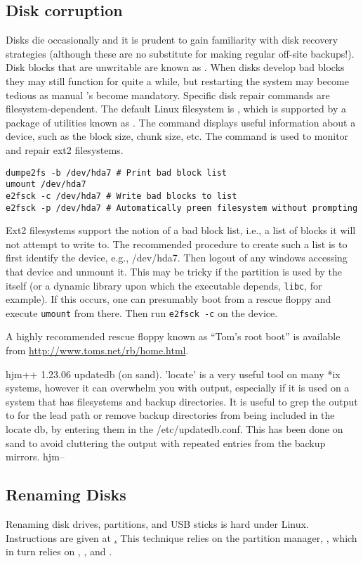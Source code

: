 \documentclass[12pt,twoside]{article}
\begin{document}
\subsection{Disk corruption}\label{sxn:fsck}
Disks die occasionally and it is prudent to gain familiarity with
disk recovery strategies (although these are no substitute for 
making regular off-site backups!).
Disk blocks that are unwritable are known as .
When disks develop bad blocks they may still function for quite a
while, but restarting the system may become tedious as manual
's become mandatory. 
Specific disk repair commands are filesystem-dependent.
The default Linux filesystem is , which is supported by a
package of utilities known as .
The  command displays useful information about a
device, such as the block size, chunk size, etc.
The  command is used to monitor and repair ext2
filesystems. 
\begin{verbatim}
dumpe2fs -b /dev/hda7 # Print bad block list
umount /dev/hda7
e2fsck -c /dev/hda7 # Write bad blocks to list
e2fsck -p /dev/hda7 # Automatically preen filesystem without prompting
\end{verbatim}
Ext2 filesystems support the notion of a bad block list, i.e., a list
of blocks it will not attempt to write to.
The recommended procedure to create such a list is to first identify
the device, e.g., /dev/hda7.
Then logout of any windows accessing that device and unmount it.
This may be tricky if the partition is used by the 
itself (or a dynamic library upon which the executable depends,
\verb'libc', for example).
If this occurs, one can presumably boot from a rescue floppy and
execute \verb'umount' from there.
Then run \verb'e2fsck -c' on the device.

A highly recommended rescue floppy known as ``Tom's root boot'' is
available from \url{http://www.toms.net/rb/home.html}.

hjm++ 1.23.06
updatedb (on sand).
'locate' is a very useful tool on many *ix systems, however it can 
overwhelm you with output, especially if it is used on a system that has 
filesystems and backup directories.  It is useful to grep the output to 
for the lead path or remove backup directories from being included in 
the locate db, by entering them in the /etc/updatedb.conf.  This has been 
done on sand to avoid cluttering the output with repeated entries from
the backup mirrors.
hjm-- 

\subsection{Renaming Disks}\label{sxn:rnm}
Renaming disk drives, partitions, and USB sticks is hard under Linux. 
Instructions are given at
\href{https://help.ubuntu.com/community/RenameUSBDrive}.
This technique relies on the  partition manager,
, which in turn relies on ,
, and .
\end{document}
